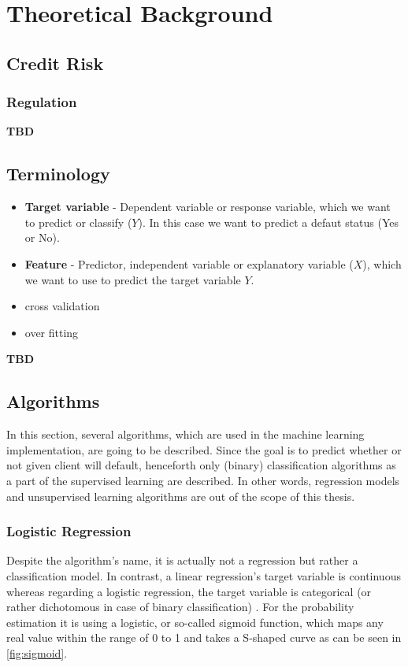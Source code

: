\chapter{Theoretical Background}
\label{chap:two}

\section{Credit Risk}

\subsection{Regulation}

\textbf{TBD}

\section{Terminology}
\begin{itemize}\setlength\itemsep{0em}
	\item \textbf{Target variable} - Dependent variable or response variable, which we want to predict or classify ($Y$). In this case we want to predict a defaut status (Yes or No).
	\item \textbf{Feature} - Predictor, independent variable or explanatory variable ($X$), which we want to use to predict the target variable $Y$.
	\item cross validation
	\item over fitting
\end{itemize}


\textbf{TBD}
\section{Algorithms}
\label{sec:algorithms}

In this section, several algorithms, which are used in the machine learning implementation, are going to be described. Since the goal is to predict whether or not given client will default, henceforth only (binary) classification algorithms as a part of the supervised learning are described. In other words, regression models and unsupervised learning algorithms are out of the scope of this thesis.
\subsection{Logistic Regression}

Despite the algorithm's name, it is actually not a regression but rather a classification model.
In contrast, a linear regression's target variable is continuous whereas regarding a logistic regression, the target variable is categorical (or rather dichotomous in case of binary classification) \citep{wendler2021data}.
For the probability estimation it is using a logistic, or so-called sigmoid function, which maps any real value within the range of 0 to 1 and takes a S-shaped curve as can be seen in \autoref{fig:sigmoid}.

